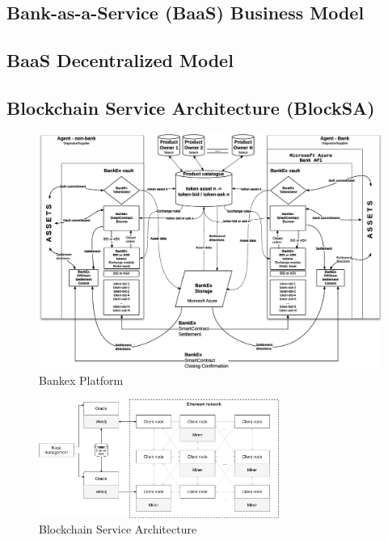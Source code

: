 \documentclass{article}
\begin{document}
\subsection{Bank-as-a-Service (BaaS) Business Model}

\subsection{BaaS Decentralized Model}

%

\subsection{Blockchain Serviсe Architecture (BlockSA)}

\begin{figure}
  \centering
  \includegraphics[width=\textwidth]{bankex-platform.eps}
  \caption{Bankex Platform}
  \label{fig:bankex-platform}
\end{figure}

\begin{figure}
  \centering
  \includegraphics[width=0.7\textwidth]{blockchain-microservice-architecture.png}
  \caption{Blockchain Service Architecture}
  \label{fig:architecture-png}
\end{figure}
\end{document}
